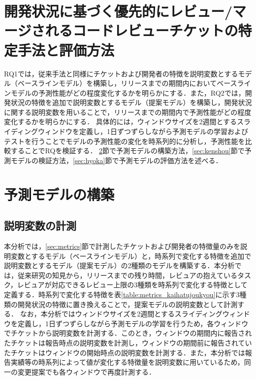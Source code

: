 \documentclass[submit]{ipsj}
\begin{document}


\section{開発状況に基づく優先的にレビュー/マージされるコードレビューチケットの特定手法と評価方法}\label{sec:analysis_method}

RQ1では，従来手法と同様にチケットおよび開発者の特徴を説明変数とするモデル（ベースラインモデル）を構築し，リリースまでの期間内においてベースラインモデルの予測性能がどの程度変化するかを明らかにする．また，RQ2では，開発状況の特徴を追加で説明変数とするモデル（提案モデル）を構築し，開発状況に関する説明変数を用いることで，リリースまでの期間内で予測性能がどの程度変化するかを明らかにする．
具体的には，ウィンドウサイズを2週間とするスライディングウィンドウを定義し，1日ずつずらしながら予測モデルの学習およびテストを行うことでモデルの予測性能の変化を時系列的に分析し，予測性能を比較することでRQを検証する．
\ref{sec:koutiku}節で予測モデルの構築方法，\ref{sec:kenshou}節で予測モデルの検証方法，\ref{sec:hyoka}節で予測モデルの評価方法を述べる．


\section{予測モデルの構築}\label{sec:koutiku}

\subsection{説明変数の計測}\label{sec:setumeihensuu}
本分析では，\ref{sec:metrics}節で計測したチケットおよび開発者の特徴量のみを説明変数とするモデル（ベースラインモデル）と，時系列で変化する特徴を追加で説明変数とするモデル（提案モデル）の2種類のモデルを構築する．本分析では，従来研究\cite{integrator}\cite{release_merge}の知見から，リリースまでの残り時間，レビュアの抱えているタスク，レビュアが対応できるレビュー上限の3種類を時系列で変化する特徴として定義する．時系列で変化する特徴を表\ref{table:metrics_kaihatujoukyou}に示す3種類の開発状況の特徴に置き換えることで，提案モデルの説明変数として計測する．
なお，本分析ではウィンドウサイズを2週間とするスライディングウィンドウを定義し，1日ずつずらしながら予測モデルの学習を行うため，各ウィンドウでチケットから説明変数を計測する．このとき，ウィンドウの期間内に報告されたチケットは報告時点の説明変数を計測し，ウィンドウの期間前に報告されていたチケットはウィンドウの開始時点の説明変数を計測する．また，本分析では報告実績等の時系列によって値が変化する特徴量を説明変数に用いているため，同一の変更提案でも各ウィンドウで再度計測する．
\end{document}
